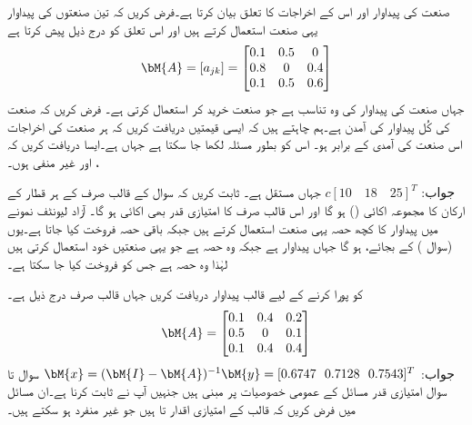  صنعت کی پیداوار اور اس کے اخراجات کا تعلق بیان کرتا ہے۔فرض کریں کہ تین صنعتوں کی پیداوار یہی صنعت استعمال کرتے ہیں اور اس تعلق کو درج ذیل    پیش کرتا ہے
\begin{align*}
\bM{A}=[a_{jk}]=\begin{bmatrix} 0.1&0.5&0\\0.8&0&0.4\\0.1&0.5&0.6 \end{bmatrix}
\end{align*}
جہاں  صنعت  کی پیداوار کی وہ تناسب  ہے جو صنعت  خرید کر استعمال کرتی ہے۔ فرض کریں کہ صنعت  کی کُل پیداوار کی آمدن   ہے۔ہم چاہتے ہیں کہ ایسی قیمتیں دریافت کریں کہ ہر صنعت کی اخراجات اس صنعت کی آمدی کے برابر ہو۔ اس کو بطور مسئلہ  لکھا جا سکتا ہے جہاں  ہے۔ایسا  دریافت کریں کہ ،  اور  غیر منفی ہوں۔

جواب:
$c[10\quad 18\quad 25]^T$
جہاں  مستقل ہے۔
ثابت کریں کہ سوال  کے قالب صرف  کے ہر قطار کے ارکان کا مجموعہ اکائی () ہو گا اور اس قالب صرف کا امتیازی قدر بھی اکائی ہو گا۔
آزاد لیونٹف نمونے میں پیداوار کا کچھ حصہ یہی صنعت استعمال کرتے ہیں جبکہ باقی حصہ فروخت کیا جاتا ہے۔یوں  (سوال ) کے بجائے،    ہو گا جہاں  پیداوار ہے جبکہ  وہ حصہ ہے جو یہی صنعتیں خود استعمال کرتی ہیں لہٰذا  وہ حصہ ہے جس کو فروخت کیا جا سکتا ہے۔

  کو پورا کرنے کے لیے قالب پیداوار  دریافت کریں جہاں قالب صرف درج ذیل ہے۔
\begin{align*}
\bM{A}=\begin{bmatrix} 0.1&0.4&0.2\\0.5&0&0.1\\0.1&0.4&0.4 \end{bmatrix}
\end{align*}
جواب:
$\bM{x}=(\bM{I}-\bM{A})^{-1}\bM{y}=[0.6747\,\,\,\,0.7128\,\,\,\,0.7543]^T$
سوال  تا سوال  امتیازی قدر مسائل کے عمومی خصوصیات پر مبنی ہیں جنہیں آپ نے ثابت کرنا ہے۔ان مسائل میں فرض کریں کہ  قالب  کے امتیازی اقدار  تا   ہیں جو غیر منفرد ہو سکتے ہیں۔

